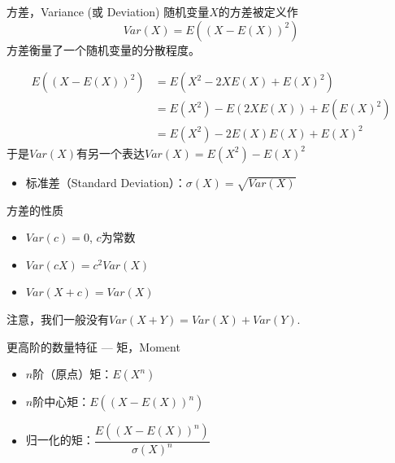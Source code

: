 \begin{frame}

\begin{block}{方差，Variance (或 Deviation)}
随机变量$X$的方差被定义作
$$Var(X) = E((X-E(X))^2)$$
方差衡量了一个随机变量的分散程度。
\end{block}\pause
\begin{align*}
E((X-E(X))^2) & = E(X^2 - 2XE(X) + E(X)^2) \\
& = E(X^2) - E(2XE(X)) + E(E(X)^2) \\
& = E(X^2) - 2E(X)E(X) + E(X)^2
\end{align*}
于是$Var(X)$有另一个表达$Var(X) = E(X^2) - E(X)^2$

\pause

\begin{itemize}
\item 标准差（Standard Deviation）：$\sigma(X) = \sqrt{Var(X)}$
\end{itemize}

\end{frame}


\begin{frame}

\begin{block}{方差的性质}
\begin{itemize}
\item $Var(c) = 0$, $c$为常数
\item $Var(cX) = c^2 Var(X)$
\item $Var(X+c) = Var(X)$
\end{itemize}

\vspace{1em}
\pause

注意，我们一般{\color{red}没有}$Var(X+Y) = Var(X) + Var(Y).$
\end{block}

\vspace{1em}
\pause

\begin{block}{更高阶的数量特征 --- 矩，Moment}
\begin{itemize}
\item $n$阶（原点）矩：$E(X^n)$
\item $n$阶中心矩：$E((X - E(X))^n)$
\pause
\item 归一化的矩：$\dfrac{E((X - E(X))^n)}{\sigma(X)^n}$
\end{itemize}
\end{block}

\end{frame}

